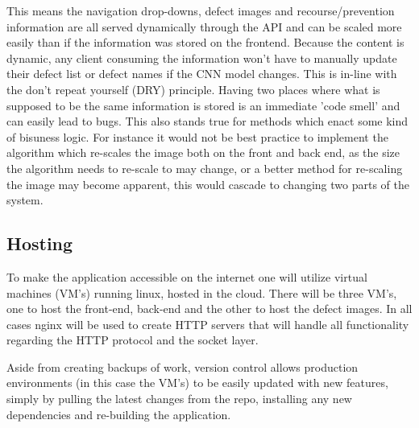       This means the navigation drop-downs, defect images and recourse/prevention information are all served dynamically through the API and can be scaled more easily than if the information was stored on the frontend. Because the content is dynamic, any client consuming the information won't have to manually update their defect list or defect names if the CNN model changes. This is in-line with the don't repeat yourself (DRY) principle. Having two places where what is supposed to be the same information is stored is an immediate 'code smell' and can easily lead to bugs. This also stands true for methods which enact some kind of bisuness logic. For instance it would not be best practice to implement the algorithm which re-scales the image both on the front and back end, as the size the algorithm needs to re-scale to may change, or a better method for re-scaling the image may become apparent, this would cascade to changing two parts of the system.

    \subsection{Hosting}
      To make the application accessible on the internet one will utilize virtual machines (VM's) running linux, hosted in the cloud. There will be three VM's, one to host the front-end, back-end and the other to host the defect images. In all cases nginx will be used to create HTTP servers that will handle all functionality regarding the HTTP protocol and the socket layer.
      \par
      Aside from creating backups of work, version control allows production environments (in this case the VM's) to be easily updated with new features, simply by pulling the latest changes from the repo, installing any new dependencies and re-building the application.

